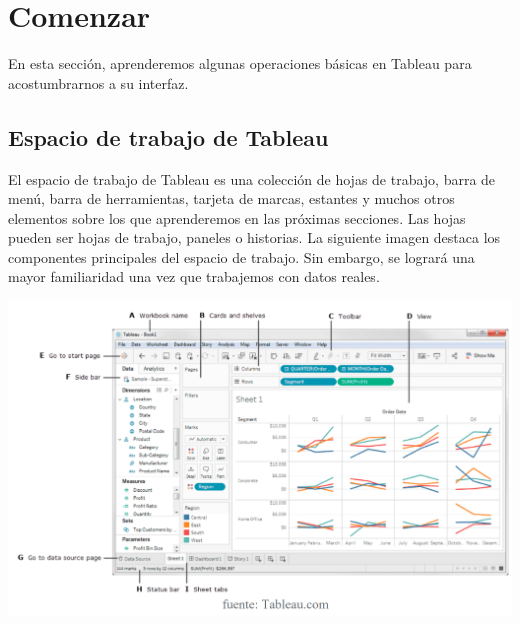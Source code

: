 \documentclass[12pt,letterpaper]{article}
\begin{document}
\section{Comenzar}
En esta sección, aprenderemos algunas operaciones básicas en Tableau para acostumbrarnos a su
interfaz. 
\subsection{Espacio de trabajo de Tableau}
El espacio de trabajo de Tableau es una colección de hojas de trabajo, barra de menú, barra de
herramientas, tarjeta de marcas, estantes y muchos otros elementos sobre los que aprenderemos en las
próximas secciones. Las hojas pueden ser hojas de trabajo, paneles o historias. La siguiente imagen
destaca los componentes principales del espacio de trabajo. Sin embargo, se logrará una mayor
familiaridad una vez que trabajemos con datos reales.
\begin{center}
    \includegraphics[width=16cm]{img/2.png}  
\end{center}
\end{document}
